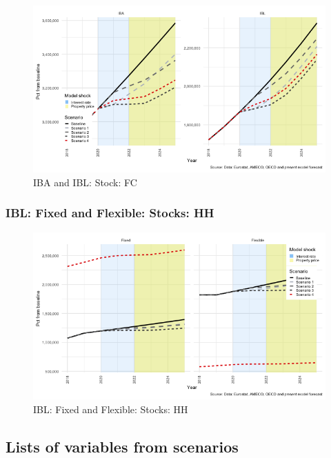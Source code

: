 \documentclass[
]{book}
\begin{document}
\begin{figure}[H]
\includegraphics[width=0.95\linewidth]{figures/fl-fi-sfc-plot-a-l-f-1} \caption{IBA and IBL: Stock: FC}\label{fig:fl-fi-sfc-plot-a-l-f}
\end{figure}

\hypertarget{ibl-fixed-and-flexible-stocks-hh}{%
\subsubsection{IBL: Fixed and Flexible: Stocks: HH}\label{ibl-fixed-and-flexible-stocks-hh}}

\begin{figure}[H]
\includegraphics[width=0.95\linewidth]{figures/fl-fi-sfc-plot-ibl-h-1} \caption{IBL: Fixed and Flexible: Stocks: HH}\label{fig:fl-fi-sfc-plot-ibl-h}
\end{figure}

\hypertarget{sec:list-of-variables-shocks}{%
\subsection{Lists of variables from scenarios}\label{sec:list-of-variables-shocks}}
\end{document}
